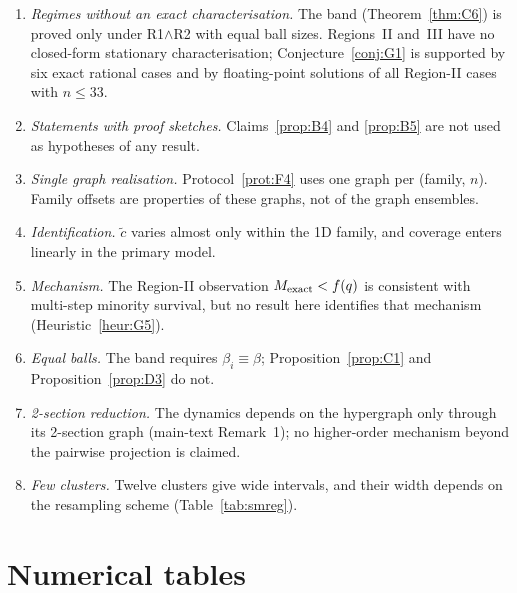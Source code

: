 \documentclass[pdflatex,sn-mathphys-num]{sn-jnl}
\theoremstyle{thmstyleone}%
\theoremstyle{thmstylethree}%
\theoremstyle{thmstyletwo}%
\newcommand{\ctil}{\tilde{c}}
\begin{document}
\begin{enumerate}
\item \emph{Regimes without an exact characterisation.} The band
(Theorem~\ref{thm:C6}) is proved only under R1$\wedge$R2 with equal ball
sizes. Regions~II and~III have no closed-form stationary characterisation;
Conjecture~\ref{conj:G1} is supported by six exact rational cases and by
floating-point solutions of all Region-II cases with $n\le33$.
\item \emph{Statements with proof sketches.} Claims~\ref{prop:B4} and
\ref{prop:B5} are not used as hypotheses of any result.
\item \emph{Single graph realisation.} Protocol~\ref{prot:F4} uses one
graph per (family, $n$). Family offsets are properties of these graphs,
not of the graph ensembles.
\item \emph{Identification.} $\ctil$ varies almost only within the 1D
family, and coverage enters linearly in the primary model.
\item \emph{Mechanism.} The Region-II observation $M_{\rm exact}<f(q)$ is
consistent with multi-step minority survival, but no result here
identifies that mechanism (Heuristic~\ref{heur:G5}).
\item \emph{Equal balls.} The band requires $\beta_i\equiv\beta$;
Proposition~\ref{prop:C1} and Proposition~\ref{prop:D3} do not.
\item \emph{2-section reduction.} The dynamics depends on the hypergraph
only through its 2-section graph (main-text Remark~1); no higher-order
mechanism beyond the pairwise projection is claimed.
\item \emph{Few clusters.} Twelve clusters give wide intervals, and
their width depends on the resampling scheme (Table~\ref{tab:smreg}).
\end{enumerate}

\section{Numerical tables}
\label{sec:H}
\end{document}
